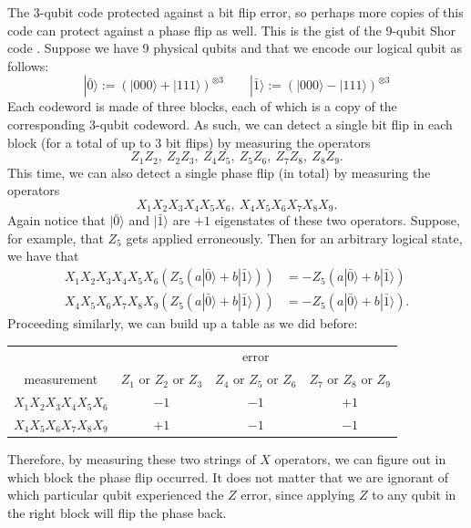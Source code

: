\documentclass[a4paper,11pt]{article}
\newcommand{\ket}[1]{|#1\rangle}
\begin{document}
The 3-qubit code protected against a bit flip error, so perhaps more copies of this code can protect against a phase flip as well.
This is the gist of the 9-qubit Shor code \cite{PhysRevA.52.R2493,Devitt_2013}.
Suppose we have 9 physical qubits and that we encode our logical qubit as follows:
\begin{equation}\label{eq:9codewords}
\ket{\bar{0}} := (\ket{000} + \ket{111})^{\otimes 3} \qquad \ket{\bar{1}} := (\ket{000} - \ket{111})^{\otimes 3}
\end{equation}
Each codeword is made of three blocks, each of which is a copy of the corresponding 3-qubit codeword.
As such, we can detect a single bit flip in each block (for a total of up to 3 bit flips) by measuring the operators
\begin{equation} \label{eq:Zstab}
Z_1 Z_2, ~ Z_2 Z_3,~ Z_4 Z_5,~ Z_5 Z_6,~ Z_7 Z_8,~ Z_8 Z_9.
\end{equation}
This time, we can also detect a single phase flip (in total) by measuring the operators
\begin{equation} \label{eq:Xstab}
X_1 X_2 X_3 X_4 X_5 X_6, ~ X_4 X_5 X_6 X_7 X_8 X_9.
\end{equation}
Again notice that $\ket{\bar{0}}$ and $\ket{\bar{1}}$ are $+1$ eigenstates of these two operators.
Suppose, for example, that $Z_5$ gets applied erroneously.
Then for an arbitrary logical state, we have that
\begin{equation}
\begin{aligned}
X_1 X_2 X_3 X_4 X_5 X_6 (Z_5 (a \ket{\bar{0}} + b \ket{\bar{1}})) &= -Z_5 (a \ket{\bar{0}} + b \ket{\bar{1}}) \\
X_4 X_5 X_6 X_7 X_8 X_9 (Z_5 (a \ket{\bar{0}} + b \ket{\bar{1}})) &= -Z_5 (a \ket{\bar{0}} + b \ket{\bar{1}}).
\end{aligned}
\end{equation}
Proceeding similarly, we can build up a table as we did before:
\begin{center}
\begin{tabular}{ c | c c c }
~ & \multicolumn{3}{c}{error} \\
measurement & $Z_1$ or $Z_2$ or $Z_3$ & $Z_4$ or $Z_5$ or $Z_6$ & $Z_7$ or $Z_8$ or $Z_9$  \\
\hline
$X_1 X_2 X_3 X_4 X_5 X_6$ & $-1$ & $-1$ & $+1$ \\
$X_4 X_5 X_6 X_7 X_8 X_9$ & $+1$ & $-1$ & $-1$
\end{tabular}
\end{center}
Therefore, by measuring these two strings of $X$ operators, we can figure out in which block the phase flip occurred.
It does not matter that we are ignorant of which particular qubit experienced the $Z$ error, since applying $Z$ to any qubit in the right block will flip the phase back.
\end{document}
